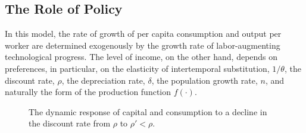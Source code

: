 \documentclass[\topdir/lecture\_notes.tex]{subfiles}
\begin{document}
\subsection{The Role of Policy}
In this model, the rate of growth of per capita consumption and output per worker are determined exogenously by the growth rate of labor-augmenting technological progress. The level of income, on the other hand, depends on preferences, in particular, on the elasticity of intertemporal substitution, $1 / \theta$, the discount rate, $\rho$, the depreciation rate, $\delta$, the population growth rate, $n$, and naturally the form of the production function $f(\cdot)$.

\begin{figure}[ht]
  \centering
  \captionsetup{labelformat=empty}
  \caption{The dynamic response of capital and consumption to a decline in the discount rate from $\rho$ to $\rho' < \rho$.}
  \label{fig:discount-change}
\end{figure}
\end{document}
